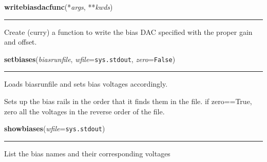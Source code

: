     \label{det:writebiasdacfunc}

    \vspace{0.5ex}

    \begin{boxedminipage}{\textwidth}

    \raggedright \textbf{writebiasdacfunc}(*\textit{args}, **\textit{kwds})

    \vspace{-1.5ex}

    \rule{\textwidth}{0.5\fboxrule}
    Create (curry) a function to write the bias DAC specified with the 
    proper gain and offset.

    \vspace{1ex}

    \end{boxedminipage}

    \label{det:setbiases}

    \vspace{0.5ex}

    \begin{boxedminipage}{\textwidth}

    \raggedright \textbf{setbiases}(\textit{biasrunfile}, \textit{wfile}=\texttt{sys.stdout}, \textit{zero}=\texttt{False})

    \vspace{-1.5ex}

    \rule{\textwidth}{0.5\fboxrule}
    Loads biasrunfile and sets bias voltages accordingly.

    Sets up the bias rails in the order that it finds them in the file. if 
    zero==True, zero all the voltages in the reverse order of the file.

    \vspace{1ex}

    \end{boxedminipage}

    \label{det:showbiases}

    \vspace{0.5ex}

    \begin{boxedminipage}{\textwidth}

    \raggedright \textbf{showbiases}(\textit{wfile}=\texttt{sys.stdout})

    \vspace{-1.5ex}

    \rule{\textwidth}{0.5\fboxrule}
    List the bias names and their corresponding voltages

    \vspace{1ex}

    \end{boxedminipage}

